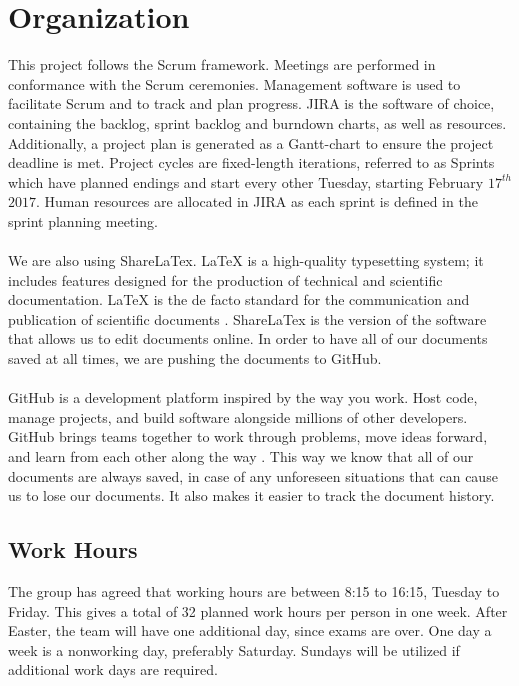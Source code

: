 \section{Organization}

This project follows the Scrum framework. Meetings are performed in conformance with the Scrum ceremonies. Management software is used to facilitate Scrum and to track and plan progress. JIRA is the software of choice, containing the backlog, sprint backlog and burndown charts, as well as resources. Additionally, a project plan is generated as a Gantt-chart to ensure the project deadline is met. Project cycles are fixed-length iterations, referred to as Sprints which have planned endings and start every other Tuesday, starting February $17^{th}$ $2017$. Human resources are allocated in JIRA as each sprint is defined in the sprint planning meeting.
\\\\
We are also using ShareLaTex. LaTeX is a high-quality typesetting system; it includes features designed for the production of technical and scientific documentation. LaTeX is the de facto standard for the communication and publication of scientific documents \cite{latex}. ShareLaTex is the version of the software that allows us to edit documents online. In order to have all of our documents saved at all times, we are pushing the documents to GitHub. 
\\\\
GitHub is a development platform inspired by the way you work. Host code, manage projects, and build software alongside millions of other developers. GitHub brings teams together to work through problems, move ideas forward, and learn from each other along the way \cite{github}. This way we know that all of our documents are always saved, in case of any unforeseen situations that can cause us to lose our documents. It also makes it easier to track the document history. 

\subsection{Work Hours}

The group has agreed that working hours are between 8:15 to 16:15, Tuesday to Friday. This gives a total of 32 planned work hours per person in one week. After Easter, the team will have one additional day, since exams are over. One day a week is a nonworking day, preferably Saturday. Sundays will be utilized if additional work days are required. 

